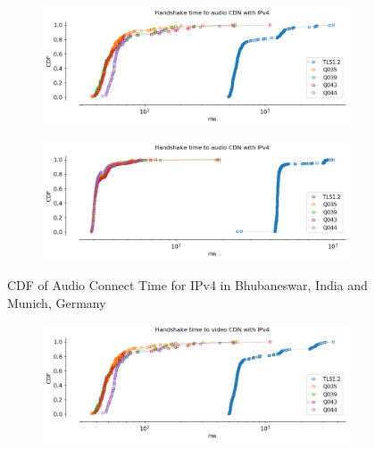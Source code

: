 \begin{frame}
\begin{figure}[!htb]
    \begin{subfigure}{0.45\textwidth}
        \includegraphics[width=\linewidth]{./plots/youtube/india/graph_audio_connect_time.png}
    \end{subfigure}
    \begin{subfigure}{0.45\textwidth}
        \includegraphics[width=\linewidth]{./plots/youtube/munich/graph_audio_connect_time.png}
    \end{subfigure}    
    \caption{CDF of Audio Connect Time for IPv4 in Bhubaneswar, India and Munich, Germany}\label{fig:cdf-of-audio}
\end{figure}
%
\begin{figure}[!htb]
    \begin{subfigure}{0.45\textwidth}
        \includegraphics[width=\linewidth]{./plots/youtube/india/graph_video_connect_time.png}

\end{subfigure}
\end{figure}
\end{frame}
